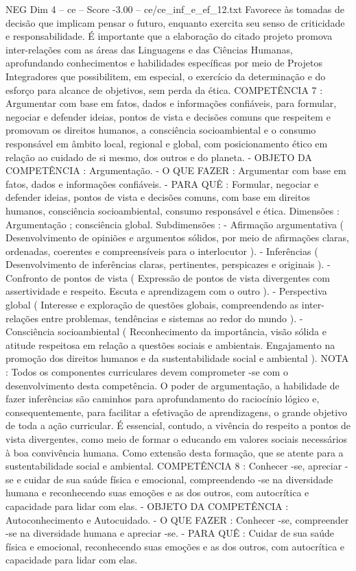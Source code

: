 \begin{textsample}{NEG Dim 4 – ce – Score -3.00 – ce/ce\_inf\_e\_ef\_12.txt}
Favorece às tomadas de decisão que implicam pensar o futuro, enquanto exercita seu senso de criticidade e responsabilidade.
É importante que a elaboração do citado projeto promova inter-relações com as áreas das Linguagens e das Ciências Humanas, aprofundando conhecimentos e habilidades específicas por meio de Projetos Integradores que possibilitem, em especial, o exercício da determinação e do esforço para alcance de objetivos, sem perda da ética.
COMPETÊNCIA 7 : Argumentar com base em fatos, dados e informações confiáveis, para formular, negociar e defender ideias, pontos de vista e decisões comuns que respeitem e promovam os direitos humanos, a consciência socioambiental e o consumo responsável em âmbito local, regional e global, com posicionamento ético em relação ao cuidado de si mesmo, dos outros e do planeta. - OBJETO DA COMPETÊNCIA : Argumentação. - O QUE FAZER : Argumentar com base em fatos, dados e informações confiáveis. - PARA QUÊ : Formular, negociar e defender ideias, pontos de vista e decisões comuns, com base em direitos humanos, consciência socioambiental, consumo responsável e ética.
Dimensões : Argumentação ; consciência global.
Subdimensões : - Afirmação argumentativa ( Desenvolvimento de opiniões e argumentos sólidos, por meio de afirmações claras, ordenadas, coerentes e compreensíveis para o interlocutor ). - Inferências ( Desenvolvimento de inferências claras, pertinentes, perspicazes e originais ). - Confronto de pontos de vista ( Expressão de pontos de vista divergentes com assertividade e respeito.
Escuta e aprendizagem com o outro ). - Perspectiva global ( Interesse e exploração de questões globais, compreendendo as inter-relações entre problemas, tendências e sistemas ao redor do mundo ). - Consciência socioambiental ( Reconhecimento da importância, visão sólida e atitude respeitosa em relação a questões sociais e ambientais.
Engajamento na promoção dos direitos humanos e da sustentabilidade social e ambiental ).
NOTA : Todos os componentes curriculares devem comprometer -se com o desenvolvimento desta competência.
O poder de argumentação, a habilidade de fazer inferências são caminhos para aprofundamento do raciocínio lógico e, consequentemente, para facilitar a efetivação de aprendizagens, o grande objetivo de toda a ação curricular.
É essencial, contudo, a vivência do respeito a pontos de vista divergentes, como meio de formar o educando em valores sociais necessários à boa convivência humana.
Como extensão desta formação, que se atente para a sustentabilidade social e ambiental.
COMPETÊNCIA 8 : Conhecer -se, apreciar -se e cuidar de sua saúde física e emocional, compreendendo -se na diversidade humana e reconhecendo suas emoções e as dos outros, com autocrítica e capacidade para lidar com elas. - OBJETO DA COMPETÊNCIA : Autoconhecimento e Autocuidado. - O QUE FAZER : Conhecer -se, compreender -se na diversidade humana e apreciar -se. - PARA QUÊ : Cuidar de sua saúde física e emocional, reconhecendo suas emoções e as dos outros, com autocrítica e capacidade para lidar com elas.

\end{textsample}
